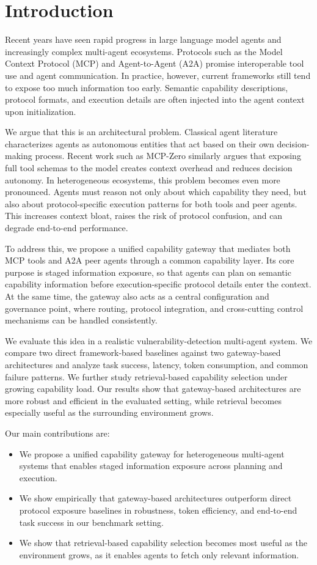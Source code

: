 \section{Introduction}

Recent years have seen rapid progress in large language model agents and increasingly complex multi-agent ecosystems.
Protocols such as the Model Context Protocol (MCP) and Agent-to-Agent (A2A) promise interoperable tool use and agent communication.
In practice, however, current frameworks still tend to expose too much information too early.
Semantic capability descriptions, protocol formats, and execution details are often injected into the agent context upon initialization.

We argue that this is an architectural problem.
Classical agent literature characterizes agents as autonomous entities that act based on their own decision-making process\cite{agent_autonomy_definition}.
Recent work such as MCP-Zero\cite{fei2025mcpzero} similarly argues that exposing full tool schemas to the model creates context overhead and reduces decision autonomy.
In heterogeneous ecosystems, this problem becomes even more pronounced.
Agents must reason not only about which capability they need, but also about protocol-specific execution patterns for both tools and peer agents.
This increases context bloat, raises the risk of protocol confusion, and can degrade end-to-end performance.

To address this, we propose a unified capability gateway that mediates both MCP tools and A2A peer agents through a common capability layer.
Its core purpose is staged information exposure, so that agents can plan on semantic capability information before execution-specific protocol details enter the context.
At the same time, the gateway also acts as a central configuration and governance point, where routing, protocol integration, and cross-cutting control mechanisms can be handled consistently.

We evaluate this idea in a realistic vulnerability-detection multi-agent system.
We compare two direct framework-based baselines against two gateway-based architectures and analyze task success, latency, token consumption, and common failure patterns.
We further study retrieval-based capability selection under growing capability load.
Our results show that gateway-based architectures are more robust and efficient in the evaluated setting, while retrieval becomes especially useful as the surrounding environment grows.

Our main contributions are:
\begin{itemize}
    \item We propose a unified capability gateway for heterogeneous multi-agent systems that enables staged information exposure across planning and execution.
    \item We show empirically that gateway-based architectures outperform direct protocol exposure baselines in robustness, token efficiency, and end-to-end task success in our benchmark setting.
    \item We show that retrieval-based capability selection becomes most useful as the environment grows, as it enables agents to fetch only relevant information.
\end{itemize}
